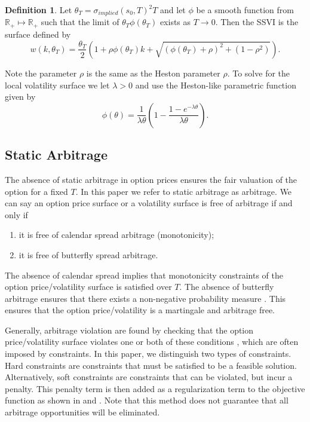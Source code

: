 \documentclass{article}
\theoremstyle{plain}%
\theoremstyle{definition}
\newtheorem{definition}[theorem]{Definition}
\theoremstyle{remark}
\begin{document}
\begin{definition}
	Let $\theta_T = \sigma_{implied}(s_0,T)^2T$ and let $\phi$ be a smooth function from $\mathbb{R}_{+} \mapsto\mathbb{R}_{+}$ such that the limit of $\theta_T\phi(\theta_T)$ exists as $T\rightarrow 0$. Then the SSVI is the surface defined by \citep{gatheral-2014}
    \begin{equation}
    	w(k,\theta_T) = \frac{\theta_T}{2}\left(1+\rho\phi(\theta_T)k+\sqrt{(\phi(\theta_T)+\rho)^2+(1-\rho^2)}\right).
    \label{eq:heston_like_ssvi}
    \end{equation}
\end{definition}
Note the parameter $\rho$ is the same as the Heston parameter $\rho$. To solve for the local volatility surface we let $\lambda > 0$ and use the Heston-like parametric function given by \citep{gatheral-2014}
\begin{equation}
	\phi(\theta) = \frac{1}{\lambda\theta}\left(1-\frac{1-e^{-\lambda\theta}}{\lambda\theta}\right).
\label{eq:heston-parametric-function}
\end{equation}

\subsection{Static Arbitrage}
The absence of static arbitrage in option prices ensures the fair valuation of the option for a fixed $T$. In this paper we refer to static arbitrage as arbitrage. We can say an option price surface or a volatility surface is free of arbitrage if and only if \citep{gatheral-2014}
\begin{enumerate}
\item it is free of calendar spread arbitrage (monotonicity);
\item it is free of butterfly spread arbitrage.
\end{enumerate}
The absence of calendar spread implies that monotonicity constraints of the option price/volatility surface is satisfied over $T$. The absence of butterfly arbitrage ensures that there exists a non-negative probability measure \citep{gatheral-2014}. This ensures that the option price/volatility is a martingale and arbitrage free.

Generally, arbitrage violation are found by checking that the option price/volatility surface violates one or both of these conditions \citep{carr-2005}, which are often imposed by constraints. In this paper, we distinguish two types of constraints. Hard constraints are constraints that must be satisfied to be a feasible solution. Alternatively, soft constraints are constraints that can be violated, but incur a penalty. This penalty term is then added as a regularization term to the objective function as shown in \citep{itkin-2019} and \citep{ackerer-2020}. Note that this method does not guarantee that all arbitrage opportunities will be eliminated.
\end{document}
